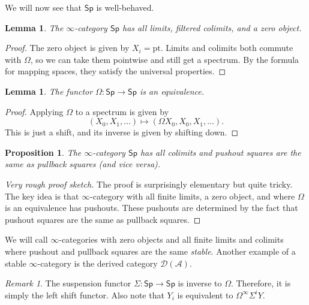 \documentclass[10pt, oneside]{memoir}
\newtheorem{prop}[thm]{Proposition}
\newtheorem{lem}[thm]{Lemma}
\theoremstyle{definition}
\theoremstyle{remark}
\newtheorem{rmk}[thm]{Remark}
\theoremstyle{plain}
\theoremstyle{definition}
\theoremstyle{remark}
\newcommand{\mc}[1]{\mathcal{#1}}
\newcommand{\mr}[1]{\mathrm{#1}}
\newcommand{\ms}[1]{\mathsf{#1}}
\newcommand{\1}{\mathbf{1}}
\newcommand{\2}{\mathbf{2}}
\newcommand{\3}{\mathbf{3}}
\newcommand{\pt}{\mr{pt}}
\begin{document}
We will now see that $\ms{Sp}$ is well-behaved.

\begin{lem}
    The $\infty$-category $\ms{Sp}$ has all limits, filtered colimits, and a zero object.
\end{lem}

\begin{proof}
    The zero object is given by $X_i = \pt$. Limits and colimits both commute with $\Omega$, so we can take them pointwise and still get a spectrum. By the formula for mapping spaces, they satisfy the universal properties.
\end{proof}

\begin{lem}
    The functor $\Omega \colon \ms{Sp} \to \ms{Sp}$ is an equivalence.
\end{lem}

\begin{proof}
    Applying $\Omega$ to a spectrum is given by
    \[ (X_0, X_1, \ldots) \mapsto (\Omega X_0, X_0, X_1, \ldots). \]
    This is just a shift, and its inverse is given by shifting down.
\end{proof}

\begin{prop}
    The $\infty$-category $\ms{Sp}$ has all colimits and pushout squares are the same as pullback squares (and vice versa).
\end{prop}


\begin{proof}[Very rough proof sketch]
    The proof is surprisingly elementary but quite tricky. The key idea is that $\infty$-category with all finite limits, a zero object, and where $\Omega$ is an equivalence has pushouts. These pushouts are determined by the fact that pushout squares are the same as pullback squares.
\end{proof}

We will call $\infty$-categories with zero objects and all finite limits and colimits where pushout and pullback squares are the same \textit{stable}. Another example of a stable $\infty$-category is the derived category $\mc{D}(\mc{A})$.

\begin{rmk}
    The suspension functor $\Sigma \colon \ms{Sp} \to \ms{Sp}$ is inverse to $\Omega$. Therefore, it is simply the left shift functor. Also note that $Y_i$ is equivalent to $\Omega^{\infty} \Sigma^i Y$.
\end{rmk}
\end{document}
